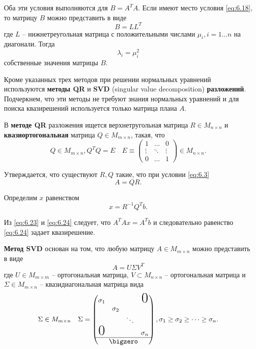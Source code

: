 Оба эти условия выполняются для $B = A^TA$. Если имеют место условия \ref{eq:6.18}, то матрицу $B$ можно представить в виде
\begin{equation}
	B = LL^T
\end{equation}
где $L$ -- нижнетреугольная матрица с положительными числами $\mu_i, i=1 \dots n$ на диагонали. Тогда
\begin{equation}
	\lambda_i = \mu_i^2
\end{equation}
собственные значения матрицы $B$.

Кроме указанных трех методов при решении нормальных уравнений используются \textbf{методы QR} и \textbf{SVD} (singular value decomposition) \textbf{разложений}. Подчеркнем, что эти методы не требуют знания нормальных уравнений и для поиска квазирешений используется только матрица плана $A$.

В \textbf{методе QR} разложения ищется верхнетругольная матрица $R \in M_{n \times n}$ и \textbf{квазиортогональная} матрица $Q \in M_{m \times n}$, такая, что 
\begin{equation}
	Q \in M_{m \times n}, Q^TQ = E \quad 
	E \equiv \begin{pmatrix}
		1 & \dots & 0  \\
		\vdots & \ddots & \vdots \\
		0 & \dots & 1 
	\end{pmatrix} \in M_{n \times n}.
\end{equation}

Утверждается, что существуют $R, Q$ такие, что при условии \ref{eq:6.3}
\begin{equation} \label{eq:6.23}
	A = QR.
\end{equation}

Определим $x$ равенством
\begin{equation} \label{eq:6.24}
	x = R^{-1}Q^Tb.
\end{equation}

Из \ref{eq:6.23} и \ref{eq:6.24} следует, что $A^TAx = A^Tb$ и следовательно равенство \ref{eq:6.24} задает квазирешение.

\textbf{Метод SVD} основан на том, что любую матрицу $A \in M_{m \times n}$ можно представить в виде 
\begin{equation}
	A = U\Sigma V^T
\end{equation}
где $U \in M_{m \times m}$ -- ортогональная матрица, $V \subset M_{n \times n}$ -- ортогональная матрица и $\Sigma \in M_{m \times n}$ -- квазидиагональная матрица вида
\begin{equation}
	\Sigma \in M_{m \times n} \quad 
	\Sigma = \begin{pmatrix}
		\begin{matrix}
			\sigma_1 &  &  & \text{\huge0} \\
			 & \sigma_2 & & \\
			&  & \ddots & \\
			\text{\huge0}& & & \sigma_n 
		\end{matrix} \\
		\hline 
		\bigzero
	\end{pmatrix}, \sigma_1 \geq \sigma_2 \geq \dots \geq \sigma_n.
\end{equation}

